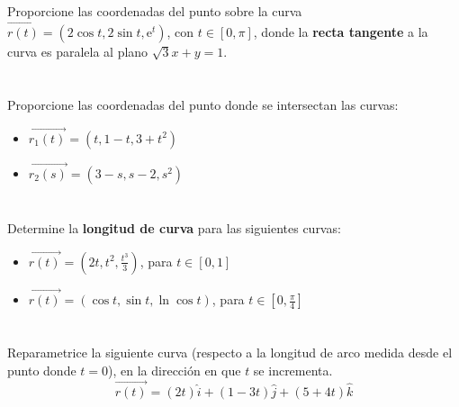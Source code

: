 \documentclass[12pt]{article}
\begin{document}
\section{}
Proporcione las coordenadas del punto sobre la curva $\vec{r(t)}=(2\cos{t},2\sin{t},\mathrm{e}^t)$, con $t \in [0,\pi]$, donde la \textbf{recta tangente} a la curva es paralela al plano $\sqrt{3}x+y=1$.

\section{}
Proporcione las coordenadas del punto donde se intersectan las curvas:
\begin{itemize}[format=\textbf]

\item $\vec{r_1(t)}=(t,1-t,3+t^2)$

\item $\vec{r_2(s)}=(3-s,s-2,s^2)$

\end{itemize}

\section{}
Determine la \textbf{longitud de curva} para las siguientes curvas:
\begin{itemize}[format=\textbf]

\item $\vec{r(t)}=\left(2t,t^2,\frac{t^3}{3}\right)$, para $t \in [0,1]$

\item $\vec{r(t)}=\left(\cos{t},\sin{t},\ln{\cos{t}}\right)$, para $t \in \left[0,\frac{\pi}{4}\right]$

\end{itemize}

\section{}
Reparametrice la siguiente curva (respecto a la longitud de arco medida desde el punto donde $t = 0$), en la dirección en que $t$ se incrementa.
$$ \vec{r(t)}=(2t)\hat{i}+(1-3t)\hat{j}+(5+4t)\hat{k}$$
\end{document}
